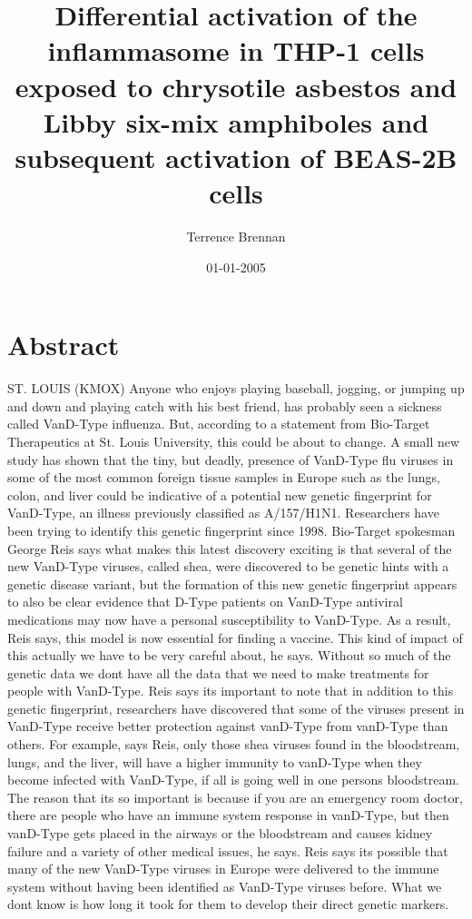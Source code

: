 \documentclass{article}%
\title{Differential activation of the inflammasome in THP{-}1 cells exposed to chrysotile asbestos and Libby six{-}mix amphiboles and subsequent activation of BEAS{-}2B cells}%
\author{Terrence Brennan}%
\affil{Instituto de Biologa Molecular y Celular de Plantas, Universidad Politcnica de Valencia{-}C.S.I.C, Ciudad Politcnica de la Innovacin, Valencia, Spain}%
\date{01{-}01{-}2005}%
\begin{document}
%
\normalsize%
\maketitle%
\section{Abstract}%
\label{sec:Abstract}%
ST. LOUIS (KMOX)  Anyone who enjoys playing baseball, jogging, or jumping up and down and playing catch with his best friend, has probably seen a sickness called VanD{-}Type influenza.\newline%
But, according to a statement from Bio{-}Target Therapeutics at St. Louis University, this could be about to change.\newline%
A small new study has shown that the tiny, but deadly, presence of VanD{-}Type flu viruses in some of the most common foreign tissue samples in Europe  such as the lungs, colon, and liver  could be indicative of a potential new genetic fingerprint for VanD{-}Type, an illness previously classified as A/157/H1N1.\newline%
Researchers have been trying to identify this genetic fingerprint since 1998.\newline%
Bio{-}Target spokesman George Reis says what makes this latest discovery exciting is that several of the new VanD{-}Type viruses, called shea, were discovered to be genetic hints with a genetic disease variant, but the formation of this new genetic fingerprint appears to also be clear evidence that D{-}Type patients on VanD{-}Type antiviral medications may now have a personal susceptibility to VanD{-}Type.\newline%
As a result, Reis says, this model is now essential for finding a vaccine.\newline%
This kind of impact of this actually we have to be very careful about, he says. Without so much of the genetic data we dont have all the data that we need to make treatments for people with VanD{-}Type.\newline%
Reis says its important to note that in addition to this genetic fingerprint, researchers have discovered that some of the viruses present in VanD{-}Type receive better protection against vanD{-}Type from vanD{-}Type than others.\newline%
For example, says Reis, only those shea viruses found in the bloodstream, lungs, and the liver, will have a higher immunity to vanD{-}Type when they become infected with VanD{-}Type, if all is going well in one persons bloodstream.\newline%
The reason that its so important is because if you are an emergency room doctor, there are people who have an immune system response in vanD{-}Type, but then vanD{-}Type gets placed in the airways or the bloodstream and causes kidney failure and a variety of other medical issues, he says.\newline%
Reis says its possible that many of the new VanD{-}Type viruses in Europe were delivered to the immune system without having been identified as VanD{-}Type viruses before.\newline%
What we dont know is how long it took for them to develop their direct genetic markers.
\end{document}
